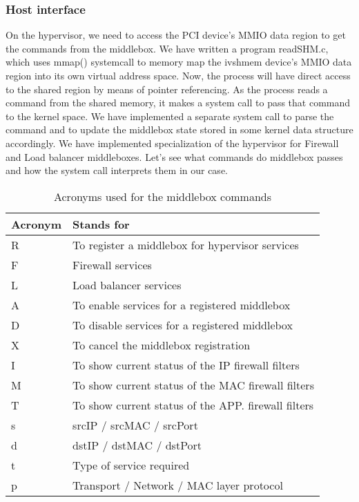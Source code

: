 \documentclass[a4paper,11pt]{report}
\begin{document}
\subsubsection{Host interface}
On the hypervisor, we need to access the PCI device's MMIO data region to get the commands from the middlebox. We have written a program readSHM.c, which uses mmap() systemcall to memory map the ivshmem device's MMIO data region into its own virtual address space. Now, the process will have direct access to the shared region by means of pointer referencing. As the process reads a command from the shared memory, it makes a system call to pass that command to the kernel space. We have implemented a separate system call to parse the command and to update the middlebox state stored in some kernel data structure accordingly. We have implemented specialization of the hypervisor for Firewall and Load balancer middleboxes. Let's see what commands do middlebox passes and how the system call interprets them in our case.   
\begin{table}[H]
\centering
\begin{tabular}{ | C{4.3cm} | L{10cm} | }
\hline
{\textbf {Acronym}} & {\textbf {Stands for}}\\ %
\hline
\hline
{R} & {To register a middlebox for hypervisor services} \\ %
\hline
{F} & {Firewall services} \\
\hline
{L} & {Load balancer services} \\
\hline
{A} & {To enable services for a registered middlebox} \\
\hline
{D} & {To disable services for a registered middlebox} \\
\hline
{X} & {To cancel the middlebox registration} \\
\hline
{I} & {To show current status of the IP firewall filters} \\
\hline
{M} & {To show current status of the MAC firewall filters} \\
\hline
{T} & {To show current status of the APP. firewall filters} \\
\hline
{s} & {srcIP / srcMAC / srcPort} \\
\hline
{d} & {dstIP / dstMAC / dstPort} \\
\hline
{t} & {Type of service required} \\
\hline
{p} & {Transport / Network / MAC layer protocol} \\
\hline
\end{tabular}
\caption{Acronyms used for the middlebox commands}
\end{table}     
\end{document}
